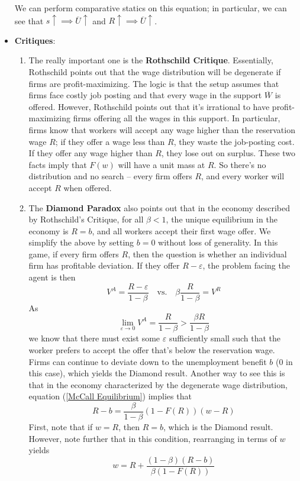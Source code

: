\documentclass[12pt]{article}
\begin{document}
\begin{itemize}
    We can perform comparative statics on this equation; in particular, we can see that $s \uparrow \implies \overline{U} \uparrow$ and $R \uparrow \implies \overline{U} \uparrow$.
    \item \textbf{Critiques}: 
    \begin{enumerate}
        \item The really important one is the \textbf{Rothschild Critique}. Essentially, Rothschild points out that the wage distribution will be degenerate if firms are profit-maximizing. The logic is that the setup assumes that firms face costly job posting and that every wage in the support $\overline{W}$ is offered. However, Rothschild points out that it's irrational to have profit-maximizing firms offering all the wages in this support. In particular, firms know that workers will accept any wage higher than the reservation wage $R$; if they offer a wage less than $R$, they waste the job-posting cost. If they offer any wage higher than $R$, they lose out on surplus. These two facts imply that $F(w)$ will have a unit mass at $R$. So there's no distribution and no search -- every firm offers $R$, and every worker will accept $R$ when offered.
        \item The \textbf{Diamond Paradox} also points out that in the economy described by Rothschild's Critique, for all $\beta < 1$, the unique equilibrium in the economy is $R = b$, and all workers accept their first wage offer. We simplify the above by setting $b=0$ without loss of generality. In this game, if every firm offers $R$, then the question is whether an individual firm has profitable deviation. If they offer $R-\varepsilon$, the problem facing the agent is then 
        \[V^A = \frac{R - \varepsilon}{1-\beta} \quad \text{vs.} \quad \beta \frac{R}{1-\beta} = V^R\]
        As
        \[\lim_{\varepsilon \to 0}V^A = \frac{R}{1-\beta} > \frac{\beta R}{1-\beta}\]
        we know that there must exist some $\varepsilon$ sufficiently small such that the worker prefers to accept the offer that's below the reservation wage. Firms can continue to deviate down to the unemployment benefit $b$ (0 in this case), which yields the Diamond result. Another way to see this is that in the economy characterized by the degenerate wage distribution, equation (\ref{McCall Equilibrium}) implies that
        \[R-b = \frac{\beta}{1-\beta}(1-F(R))(w - R)\]
        First, note that if $w = R$, then $R = b$, which is the Diamond result. However, note further that in this condition, rearranging in terms of $w$ yields
        \[w = R + \frac{(1-\beta)(R-b)}{\beta(1-F(R))}\]

\end{enumerate}
\end{itemize}
\end{document}
